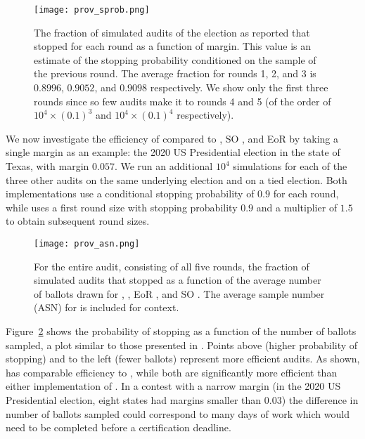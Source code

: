 \begin{figure}[h!]
\texttt{[image: prov\_sprob.png]}
\caption{The fraction of simulated \Providence audits of the election as reported that stopped for each round as a function of margin. This value is an estimate of the stopping probability conditioned on the sample of the previous round. The average fraction for rounds 1, 2, and 3 is $0.8996$, $0.9052$, and $0.9098$ respectively. We show only the first three rounds since so few audits make it to rounds 4 and 5 (of the order of $10^4 \times (0.1)^3$ and $10^4 \times (0.1)^4$ respectively).}
\label{fig:prov-sprob}
\end{figure}

We now investigate the efficiency of \Providence compared to \Minerva, SO \BRAVO, and EoR \BRAVO by taking a single margin as an example: the 2020 US Presidential election in the state of Texas, with margin $0.057$. We run an additional $10^4$ simulations for each of the three other audits on the same underlying election and on a tied election. Both \BRAVO implementations use a conditional stopping probability of $0.9$ for each round, while \Minerva uses a first round size with stopping probability $0.9$ and a multiplier of $1.5$ to obtain subsequent round sizes. 

\begin{figure}[h!]
\texttt{[image: prov\_asn.png]}
\caption{For the entire audit, consisting of all five rounds, the fraction of simulated audits that stopped as a function of the average number of ballots drawn for \Providence, \Minerva, EoR \BRAVO, and SO \BRAVO. The average sample number (ASN) for \B \BRAVO is included for context.}
\label{fig:prov-asn}
\end{figure}
Figure~\ref{fig:prov-asn} shows the probability of stopping as a function of the number of ballots sampled, a plot similar to those presented in \cite{simulations}. Points above (higher probability of stopping) and to the left (fewer ballots) represent more efficient audits. As shown, \Providence has comparable efficiency to \Minerva, while both are significantly more efficient than either implementation of \BRAVO. In a contest with a narrow margin (in the 2020 US Presidential election, eight states had margins smaller than $0.03$) the difference in number of ballots sampled could correspond to many days of work which would need to be completed before a certification deadline.







